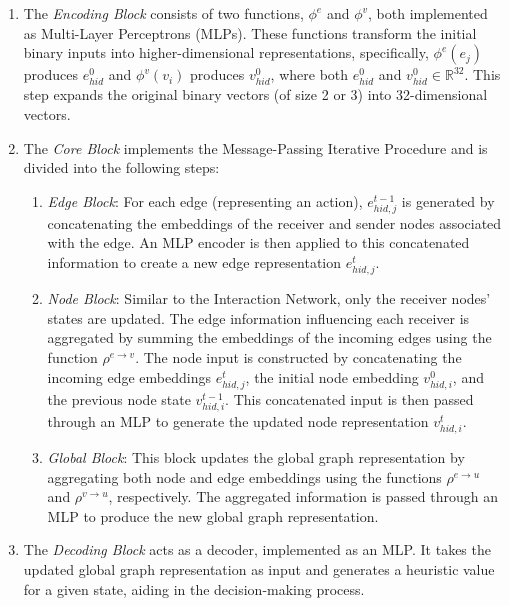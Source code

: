 \begin{enumerate}
    \item The \textit{Encoding Block} consists of two functions, $\phi^{e}$ and $\phi^{v}$, both implemented as Multi-Layer Perceptrons (MLPs). These functions transform the initial binary inputs into higher-dimensional representations, specifically, $\phi^{e}(e_j)$ produces $e_{hid}^{0}$ and $\phi^{v}(v_i)$ produces $v_{hid}^{0}$, where both $e_{hid}^{0}$ and $v_{hid}^{0} \in \mathbb{R}^{32}$. This step expands the original binary vectors (of size 2 or 3) into 32-dimensional vectors.

    \item The \textit{Core Block} implements the Message-Passing Iterative Procedure and is divided into the following steps:

        \begin{enumerate}
            \item \textit{Edge Block}: For each edge (representing an action), $e_{hid,j}^{t-1}$ is generated by concatenating the embeddings of the receiver and sender nodes associated with the edge. An MLP encoder is then applied to this concatenated information to create a new edge representation $e_{hid,j}^{t}$.

            \item \textit{Node Block}: Similar to the Interaction Network, only the receiver nodes' states are updated. The edge information influencing each receiver is aggregated by summing the embeddings of the incoming edges using the function $\rho^{e \rightarrow v}$. The node input is constructed by concatenating the incoming edge embeddings $e_{hid,j}^{t}$, the initial node embedding $v_{hid,i}^{0}$, and the previous node state $v_{hid,i}^{t-1}$. This concatenated input is then passed through an MLP to generate the updated node representation $v_{hid,i}^{t}$.

            \item \textit{Global Block}: This block updates the global graph representation by aggregating both node and edge embeddings using the functions $\rho^{e \rightarrow u}$ and $\rho^{v \rightarrow u}$, respectively. The aggregated information is passed through an MLP to produce the new global graph representation.
        \end{enumerate}

    \item The \textit{Decoding Block} acts as a decoder, implemented as an MLP. It takes the updated global graph representation as input and generates a heuristic value for a given state, aiding in the decision-making process.
\end{enumerate}

